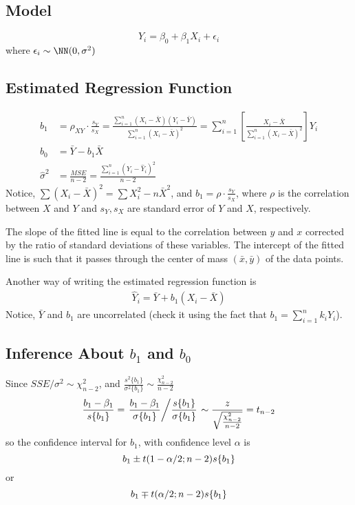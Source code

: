 \documentclass{memoir}
\begin{document}
\subsection{Model}
\begin{equation}
	Y_i = \beta_0 + \beta_1 X_i + \epsilon_i
\end{equation}
where $\epsilon_i \sim \NN(0,\sigma^2)$

\subsection{Estimated Regression Function}
\begin{align}
	b_1 & = \rho_{XY} \cdot \frac{s_Y}{s_X} = \frac{\sum_{i=1}^n (X_i-\bar X) (Y_i-\bar Y)}{\sum_{i=1}^n (X_i - \bar X)^2 } = \sum_{i=1}^n \left[\frac{X_i-\bar X}{\sum_{i=1}^n (X_i - \bar X)^2 }\right] Y_i \\
	b_0 & = \bar Y - b_1 \bar X \\
	\hat \sigma^2 & = \frac{MSE}{n-2} = \frac{\sum_{i=1}^n (Y_i - \hat Y_i)^2}{n-2}
\end{align}
Notice, $\sum(X_i-\bar X)^2 = \sum X_i^2 - n\bar X^2$, and $b_1 = \rho \cdot \frac{s_Y}{s_X}$, where $\rho$ is the correlation between $X$ and $Y$ and $s_Y, s_X$ are standard error of $Y$ and $X$, respectively.

The slope of the fitted line is equal to the correlation between $y$ and $x$ corrected by the ratio of standard deviations of these variables. The intercept of the fitted line is such that it passes through the center of mass $(\bar x, \bar y)$ of the data points.

Another way of writing the estimated regression function is
\begin{align}
	\hat Y_i = \bar Y + b_1 (X_i - \bar X)	
\end{align}
Notice, $\bar Y$ and $b_1$ are uncorrelated (check it using the fact that $b_1 = \sum_{i=1}^n k_i Y_i$).

\subsection{Inference About $b_1$ and $b_0$}
Since $SSE/\sigma^2 \sim \chi_{n-2}^2$, and $\frac{s^2\{b_1\}}{\sigma^2\{b_1\}} \sim \frac{\chi_{n-2}^2}{n-2}$
\begin{align}
	\frac{b_1-\beta_1}{s\{b_1\}} = \left. \frac{b_1-\beta_1}{\sigma\{b_1\}} \middle/ \frac{s\{b_1\}}{\sigma\{b_1\}} \right. \sim \frac{z}{\sqrt{\frac{\chi_{n-2}^2}{n-2}}} = t_{n-2}
\end{align}
so the confidence interval for $b_1$, with confidence level $\alpha$ is
\begin{equation}
	b_1 \pm t(1-\alpha/2;n-2)s\{b_1\}\\
\end{equation}
or
\begin{equation}
	b_1 \mp t(\alpha/2;n-2)s\{b_1\}\\
\end{equation}
\end{document}
